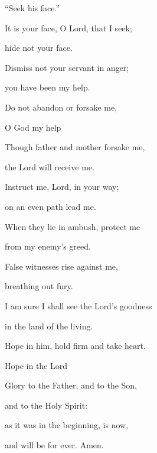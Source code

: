 “Seek his face.”

\noindent It is your face, O Lord, that I seek;~\GreStar{}~\nopagebreak

hide not your face.

\noindent Dismiss not your servant in anger;~\GreStar{}~\nopagebreak

you have been my help.

\noindent Do not abandon or forsake me,~\GreStar{}~\nopagebreak

O God my help~

\noindent Though father and mother forsake me,~\GreStar{}~\nopagebreak

the Lord will receive me.

\noindent Instruct me, Lord, in your way;~\GreStar{}~\nopagebreak

on an even path lead me.

\noindent When they lie in ambush, protect me~\GreStar{}~\nopagebreak

from my enemy’s greed.

\noindent False witnesses rise against me,~\GreStar{}~\nopagebreak

breathing out fury.

\noindent I am sure I shall see the Lord’s goodness~\GreStar{}~\nopagebreak

in the land of the living.

\noindent Hope in him, hold firm and take heart.~\GreStar{}~\nopagebreak

Hope in the Lord~

\noindent Glory to the Father, and to the Son,~\GreStar{}~\nopagebreak

and to the Holy Spirit:

\noindent as it was in the beginning, is now,~\GreStar{}~\nopagebreak

and will be for ever. Amen.
